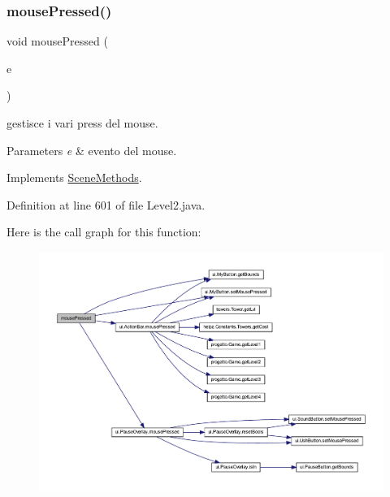 \subsubsection{\texorpdfstring{mouse\+Pressed()}{mousePressed()}}
{\footnotesize\ttfamily void mouse\+Pressed (\begin{DoxyParamCaption}\item[{Mouse\+Event}]{e }\end{DoxyParamCaption})}



gestisce i vari press del mouse. 


\begin{DoxyParams}{Parameters}
{\em e} & evento del mouse. \\
\hline
\end{DoxyParams}


Implements \hyperlink{interfacescenes_1_1_scene_methods_aed82e1ce3dd3cf283d508c3ba3be70ef}{Scene\+Methods}.



Definition at line 601 of file Level2.\+java.

Here is the call graph for this function\+:\nopagebreak
\begin{figure}[H]
\begin{center}
\leavevmode
\includegraphics[width=350pt]{classscenes_1_1_level2_aed82e1ce3dd3cf283d508c3ba3be70ef_cgraph}
\end{center}
\end{figure}
\mbox{\label{classscenes_1_1_level2_a87a07291794e15052db67f945d90853e}} 

